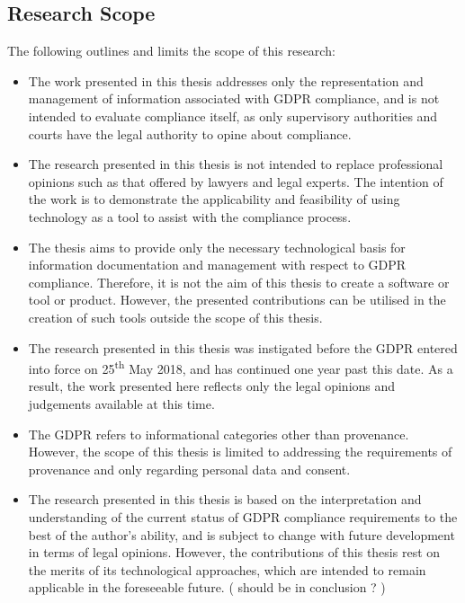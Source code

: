 
\subsection{Research Scope}\label{sec:intro-scope}
The following outlines and limits the scope of this research:
\begin{itemize}
    \item The work presented in this thesis addresses only the representation and management of information associated with GDPR compliance, and is not intended to evaluate compliance itself, as only supervisory authorities and courts have the legal authority to opine about compliance.
    \item The research presented in this thesis is not intended to replace professional opinions such as that offered by lawyers and legal experts. The intention of the work is to demonstrate the applicability and feasibility of using technology as a tool to assist with the compliance process.
    \item The thesis aims to provide only the necessary technological basis for information documentation and management with respect to GDPR compliance. Therefore, it is not the aim of this thesis to create a software or tool or product. However, the presented contributions can be utilised in the creation of such tools outside the scope of this thesis.
    \item The research presented in this thesis was instigated before the GDPR entered into force on 25\textsuperscript{th} May 2018, and has continued one year past this date. As a result, the work presented here reflects only the legal opinions and judgements available at this time.
    \item The GDPR refers to informational categories other than provenance. However, the scope of this thesis is limited to addressing the requirements of provenance and only regarding personal data and consent.
    \item The research presented in this thesis is based on the interpretation and understanding of the current status of GDPR compliance requirements to the best of the author's ability, and is subject to change with future development in terms of legal opinions. However, the contributions of this thesis rest on the merits of its technological approaches, which are intended to remain applicable in the foreseeable future. ( should be in conclusion ? )
\end{itemize}

